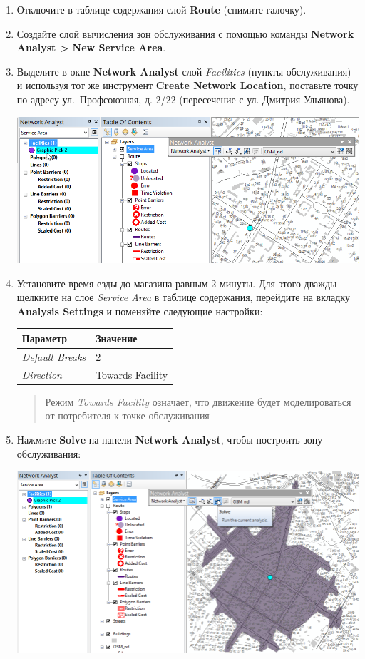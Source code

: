 \documentclass[12pt,]{book}
\begin{document}
\begin{enumerate}
\def\labelenumi{\arabic{enumi}.}
\item
  Отключите в таблице содержания слой \textbf{Route} (снимите галочку).
\item
  Создайте слой вычисления зон обслуживания с помощью команды \textbf{Network Analyst \textgreater{} New Service Area}.
\item
  Выделите в окне \textbf{Network Analyst} слой \emph{Facilities} (пункты обслуживания) и используя тот же инструмент \textbf{Create Network Location}, поставьте точку по адресу ул.~Профсоюзная, д. 2/22 (пересечение с ул. Дмитрия Ульянова).

  \includegraphics{images/Ex12/image14.png}
\item
  Установите время езды до магазина равным 2 минуты. Для этого дважды щелкните на слое \emph{Service Area} в таблице содержания, перейдите на вкладку \textbf{Analysis Settings} и поменяйте следующие настройки:

  \begin{longtable}[]{@{}ll@{}}
  \toprule
  Параметр & Значение\tabularnewline
  \midrule
  \endhead
  \emph{Default Breaks} & 2\tabularnewline
  \emph{Direction} & Towards Facility\tabularnewline
  \bottomrule
  \end{longtable}

  \begin{quote}
  Режим \emph{Towards Facility} означает, что движение будет моделироваться от потребителя к точке обслуживания
  \end{quote}
\item
  Нажмите \textbf{Solve} на панели \textbf{Network Analyst}, чтобы построить зону обслуживания:

  \includegraphics{images/Ex12/image15.png}


\end{enumerate}
\end{document}
